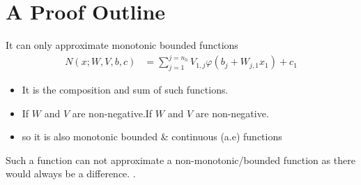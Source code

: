 \documentclass[dvipsnames,handout]{beamer}
\begin{document}
\section{A Proof Outline}
\begin{frame}{It can only approximate monotonic bounded functions}
	\begin{align*}
		N(x;W,V,b,c) &= \sum_{j=1}^{j=n_h} V_{1,j} \varphi (b_j+W_{j,1}x_1) + c_1
	\end{align*}
	\begin{itemize}
		\item It is the composition and sum of such functions.
		\item If $W$ and $V$ are non-negative.If $W$ and $V$ are non-negative.
		\item so it is also monotonic bounded \& continuous (a.e) functions
	\end{itemize}
	
	Such a function can not approximate a non-monotonic/bounded function as there would always be a difference.
	.
	
	
\end{frame}
\end{document}
